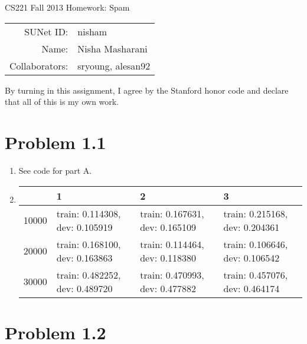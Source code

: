\documentclass[12pt]{article}
\begin{document}
\begin{center}
{\Large CS221 Fall 2013 Homework: Spam}

\begin{tabular}{rl}
SUNet ID: & nisham \\
Name: & Nisha Masharani \\
Collaborators: & sryoung, alesan92
\end{tabular}
\end{center}

By turning in this assignment, I agree by the Stanford honor code and declare
that all of this is my own work.

\section*{Problem 1.1}

\begin{enumerate}[label=(\alph*)]
  \item See code for part A.

  \item 
	  \begin{tabular}{ l | p{3cm} | p{3cm} | p{3cm} }
	    \hline
	     & 1 & 2 & 3\\ \hline
	    10000 & train: 0.114308, dev: 0.105919 & train: 0.167631, dev: 0.165109 & train: 0.215168, dev: 0.204361 \\ \hline
	    20000 & train: 0.168100, dev: 0.163863 & train: 0.114464, dev: 0.118380 & train: 0.106646, dev: 0.106542 \\ \hline
	    30000 & train: 0.482252, dev: 0.489720 & train: 0.470993, dev: 0.477882 & train: 0.457076, dev: 0.464174 \\ \hline
	  \end{tabular}
\end{enumerate}

\section*{Problem 1.2}
\end{document}
